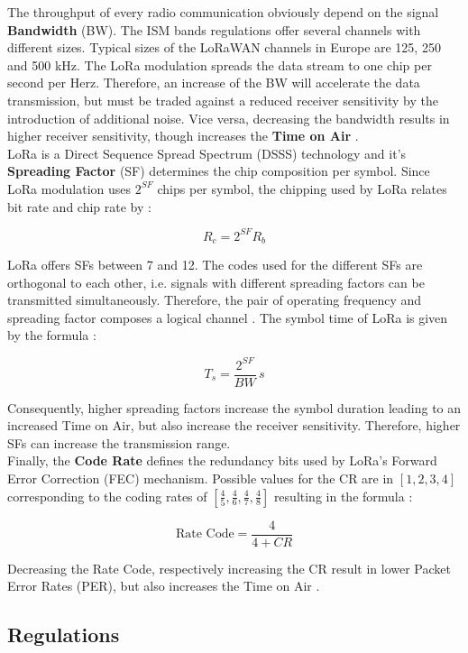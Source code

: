 \documentclass{article}
\begin{document}
The throughput of every radio communication obviously depend on the signal
\textbf{Bandwidth} (BW). The ISM bands regulations offer several channels with
different sizes. Typical sizes of the LoRaWAN channels in Europe are 125, 250
and 500 kHz.  The LoRa modulation spreads the data stream to one chip per
second per Herz. Therefore, an increase of the BW will accelerate the data
transmission, but must be traded against a reduced receiver sensitivity by the
introduction of additional noise. Vice versa, decreasing the bandwidth results
in higher receiver sensitivity, though increases the \textbf{Time on Air}
\cite{loramodulationbasics, loramodem}.\\

LoRa is a Direct Sequence Spread Spectrum (DSSS) technology and it's
\textbf{Spreading Factor} (SF) determines the chip composition per symbol.
Since LoRa modulation uses $2^{SF}$ chips per symbol, the chipping used by LoRa
relates bit rate and chip rate by \cite{loramodulationbasics}: 

$$R_{c} = 2^{SF} R_{b}$$

LoRa offers SFs between 7 and 12. The codes used for the different SFs are
orthogonal to each other, i.e. signals with different spreading factors can be
transmitted simultaneously. Therefore, the pair of operating frequency and
spreading factor composes a logical channel \cite{augustin2016study}. The
symbol time of LoRa is given by the formula \cite{loramodulationbasics}:

$$T_{s} = \frac{2^{SF}}{BW}\,s$$

Consequently, higher spreading factors increase the symbol duration leading to
an increased Time on Air, but also increase the receiver sensitivity.
Therefore, higher SFs can increase the transmission range.\\

Finally, the \textbf{Code Rate} defines the redundancy bits used by LoRa's
Forward Error Correction (FEC) mechanism. Possible values for the CR are in
$[1,2,3,4]$ corresponding to the coding rates of $[\frac{4}{5}, \frac{4}{6},
\frac{4}{7}, \frac{4}{8}]$ resulting in the formula
\cite{loramodulationbasics}:

$$\textrm{Rate Code} = \frac{4}{4+CR}$$

Decreasing the Rate Code, respectively increasing the CR result in lower Packet
Error Rates (PER), but also increases the Time on Air \cite{augustin2016study,
loramodulationbasics}.

\subsection{Regulations}
\end{document}

